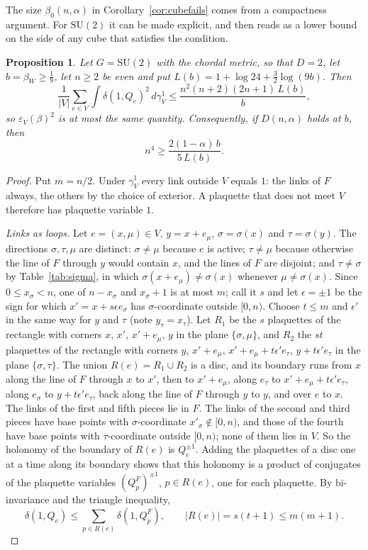\documentclass[aps,prd,twocolumn,superscriptaddress,nofootinbib,longbibliography,floatfix,amsmath,amssymb,10pt]{revtex4-2}
\newtheorem{proposition}[theorem]{Proposition}
\theoremstyle{definition}
\theoremstyle{remark}
\newcommand{\SU}{\mathrm{SU}}
\begin{document}
The size $\beta_0(n,\alpha)$ in Corollary~\ref{cor:cubefails} comes from a
compactness argument. For $\SU(2)$ it can be made explicit, and then reads as
a lower bound on the side of any cube that satisfies the condition.

\begin{proposition}\label{prop:cubesize}
Let $G=\SU(2)$ with the chordal metric, so that $D=2$, let $b=\beta_W\ge\frac19$,
let $n\ge2$ be even and put $L(b)=1+\log24+\frac32\log(9b)$. Then
\[
\frac1{|V|}\sum_{e\in V}\int\delta(1,Q_e)^2\,d\gamma^1_V\le
\frac{n^2(n+2)(2n+1)\,L(b)}b ,
\]
so $\varepsilon_V(\beta)^2$ is at most the same quantity. Consequently, if
$D(n,\alpha)$ holds at $b$, then
\[
n^4\ge\frac{2(1-\alpha)\,b}{5\,L(b)} .
\]
\end{proposition}

\begin{proof}
Put $m=n/2$. Under $\gamma^1_V$ every link outside $V$ equals $1$: the links
of $F$ always, the others by the choice of exterior. A plaquette that does
not meet $V$ therefore has plaquette variable $1$.

\emph{Links as loops.} Let $e=(x,\mu)\in V$, $y=x+e_\mu$, $\sigma=\sigma(x)$
and $\tau=\sigma(y)$. The directions $\sigma,\tau,\mu$ are distinct:
$\sigma\ne\mu$ because $e$ is active; $\tau\ne\mu$ because otherwise the line of
$F$ through $y$ would contain $x$, and the lines of $F$ are disjoint; and
$\tau\ne\sigma$ by Table~\ref{tab:sigma}, in which $\sigma(x+e_\mu)\ne\sigma(x)$
whenever $\mu\ne\sigma(x)$. Since $0\le x_\sigma<n$, one of $n-x_\sigma$ and
$x_\sigma+1$ is at most $m$; call it $s$ and let $\epsilon=\pm1$ be the sign
for which $x'=x+s\epsilon e_\sigma$ has $\sigma$-coordinate outside $[0,n)$.
Choose $t\le m$ and $\epsilon'$ in the same way for $y$ and $\tau$ (note
$y_\tau=x_\tau$). Let $R_1$ be the $s$ plaquettes of the rectangle with corners
$x$, $x'$, $x'+e_\mu$, $y$ in the plane $\{\sigma,\mu\}$, and $R_2$ the $st$
plaquettes of the rectangle with corners $y$, $x'+e_\mu$,
$x'+e_\mu+t\epsilon'e_\tau$, $y+t\epsilon'e_\tau$ in the plane $\{\sigma,\tau\}$.
The union $R(e)=R_1\cup R_2$ is a disc, and its boundary runs from $x$ along
the line of $F$ through $x$ to $x'$, then to $x'+e_\mu$, along $e_\tau$ to
$x'+e_\mu+t\epsilon'e_\tau$, along $e_\sigma$ to $y+t\epsilon'e_\tau$, back
along the line of $F$ through $y$ to $y$, and over $e$ to $x$. The links of the
first and fifth pieces lie in $F$. The links of the second and third pieces
have base points with $\sigma$-coordinate $x'_\sigma\notin[0,n)$, and those of
the fourth have base points with $\tau$-coordinate outside $[0,n)$; none of
them lies in $V$. So the holonomy of the boundary of $R(e)$ is $Q_e^{\pm1}$.
Adding the plaquettes of a disc one at a time along its boundary shows that
this holonomy is a product of conjugates of the plaquette variables
$(Q^F_p)^{\pm1}$, $p\in R(e)$, one for each plaquette. By bi-invariance and the
triangle inequality,
\[
\delta(1,Q_e)\le\sum_{p\in R(e)}\delta(1,Q^F_p),\qquad |R(e)|=s(t+1)\le
m(m+1).
\]


\end{proof}
\end{document}
